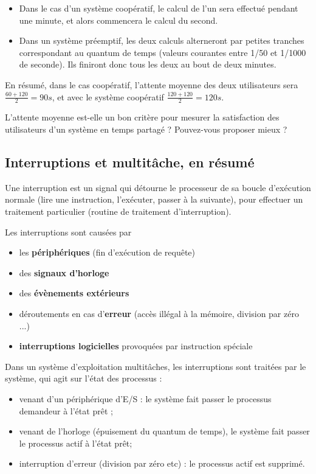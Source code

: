 \begin{multicols}{2}
\begin{itemize}
\item 
Dans le cas d'un système coopératif, le calcul de l'un sera effectué pendant une minute,
et alors commencera le calcul du second.
\item
Dans un système préemptif, les deux calculs alterneront par petites tranches correspondant au quantum de temps
(valeurs courantes entre 1/50 et 1/1000 de seconde).  Ils finiront donc tous les deux au bout de deux minutes.
\end{itemize}

En résumé, dans le cas coopératif, l'attente moyenne des deux utilisateurs sera 
$\frac{60+120}{2} = 90 s$, et avec le système coopératif 
$\frac{120+120}{2} = 120 s$.

\begin{exercice}
L'attente moyenne est-elle un bon critère pour mesurer la satisfaction
des utilisateurs d'un système en temps partagé ?  Pouvez-vous proposer
mieux ?
\end{exercice}


\subsection{Interruptions et multitâche, en résumé}

Une interruption est un signal qui détourne le processeur de sa boucle
  d'exécution normale (lire une instruction, l'exécuter, passer à la
  suivante), pour effectuer un traitement particulier (routine de
  traitement d'interruption).

Les interruptions sont causées par
\begin{itemize}
  \item les \textbf{périphériques} (fin d'exécution de requête)
  \item des \textbf{signaux d'horloge}
  \item des \textbf{évènements extérieurs}
  \item déroutements en cas d'\textbf{erreur} (accès illégal à la mémoire,
  division par zéro ...)
  \item \textbf{interruptions logicielles} provoquées par instruction spéciale 
\end{itemize}

Dans un système d'exploitation multitâches, les interruptions sont traitées par le système, qui 
agit sur l'état des processus :

\begin{itemize}
\item venant d'un périphérique d'E/S : le système fait passer le
  processus demandeur à l'état prêt ;
\item venant de l'horloge (épuisement du quantum de temps), le système
  fait passer le processus actif à l'état prêt;
\item interruption d'erreur (division par zéro etc) : le processus
  actif est supprimé.
\end{itemize}




\end{multicols}
